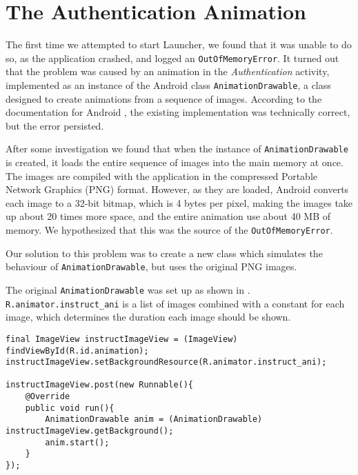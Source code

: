 \section{The Authentication Animation}
The first time we attempted to start Launcher, we found that it was unable to do so, as the application crashed, and logged an \lstinline{OutOfMemoryError}.
It turned out that the problem was caused by an animation in the \textit{Authentication} activity, implemented as an instance of the Android class \lstinline{AnimationDrawable}, a class designed to create animations from a sequence of images.
According to the documentation for Android \cite{androidreference}, the existing implementation was technically correct, but the error persisted.

After some investigation we found that when the instance of \lstinline{AnimationDrawable} is created, it loads the entire sequence of images into the main memory at once.
The images are compiled with the application in the compressed Portable Network Graphics (PNG) format.
However, as they are loaded, Android converts each image to a 32-bit bitmap, which is 4 bytes per pixel, making the images take up about 20 times more space, and the entire animation use about 40 MB of memory. We hypothesized that this was the source of the \lstinline{OutOfMemoryError}.

Our solution to this problem was to create a new class which simulates the behaviour of \lstinline{AnimationDrawable}, but uses the original PNG images.

The original \lstinline{AnimationDrawable} was set up as shown in . \lstinline{R.animator.instruct_ani} is a list of images combined with a constant for each image, which determines the duration each image should be shown.

\begin{lstlisting}[caption={The original animation implementation, using \lstinline{AnimationDrawable}.},label={lst:animationDrawable}]
final ImageView instructImageView = (ImageView) findViewById(R.id.animation);
instructImageView.setBackgroundResource(R.animator.instruct_ani);

instructImageView.post(new Runnable(){
    @Override
    public void run(){
        AnimationDrawable anim = (AnimationDrawable) instructImageView.getBackground();
        anim.start();
    }
});
\end{lstlisting}

